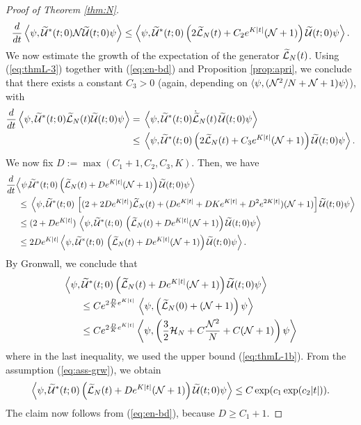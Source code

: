 \documentclass[11pt,a4paper]{article}
\newcommand{\done}{}
\newcommand{\ech}[2]{#2}	%
\newcommand{\cU}{{\cal U}}
\newcommand{\wt}{\widetilde}
\newcommand{\cH}{{\cal H}}
\newcommand{\cL}{{\cal L}}
\newcommand{\cN}{{\cal N}}
\begin{document}
\begin{proof}[Proof of Theorem \ref{thm:N}]
\[  
\frac{d}{dt} \left\langle \psi, \wt{\cU}^* (t;0) \cN \wt{\cU} (t;0) \psi \right\rangle  \leq  \left\langle \psi , \wt{\cU}^* (t;0)  \left(2 \wt{\cL}_N (t) +C_2 e^{K|t|} (\cN + 1) \right)  \wt{\cU} (t;0) \psi \right\rangle.
 \]
We now estimate the growth of the expectation\done{} of the generator $\wt{\cL}_N (t)$. Using (\ref{eq:thmL-3}) together with (\ref{eq:en-bd}) and Proposition \ref{prop:apri}, we conclude that there exists a constant $C_3 >0$ (again, depending on $\langle \psi , (\cN^2/ N + \cN + 1) \psi \rangle$\ech{ and on the constant $C$ in (\ref{eq:varphi-bds})}{}), with 
\[ \begin{split}
\frac{d}{dt} \left\langle \psi, \wt{\cU}^* (t;0) \wt{\cL}_N (t) \wt{\cU} (t;0) \psi \right\rangle = \; & \left\langle \psi, \wt{\cU}^* (t;0) \dot{\wt{\cL}}_N (t) \, \wt{\cU} (t;0) \psi \right\rangle \\ \leq \; & \left\langle \psi , \wt{\cU}^* (t;0) \left( 2 \wt{\cL}_N (t) + C_3 e^{K|t|} (\cN + 1) \right) \wt{\cU} (t;0) \psi \right\rangle. 
\end{split} \]
We now fix $D := \max (C_1 + 1, C_2 , C_3 , K)$. Then, we have
\[ \begin{split} 
\frac{d}{dt} \Big\langle \psi , &\wt{\cU}^* (t;0) \left( \wt{\cL}_N (t) + D e^{K \lvert t\rvert} (\cN + 1) \right) \wt{\cU} (t;0) \psi \Big\rangle \\  \leq \; & \left\langle \psi, \wt{\cU}^* (t;0) \, \left[ (2 + 2D e^{K|t|}) \wt{\cL}_N (t) + (D e^{K |t|} +D K e^{K |t|} + D^2 e^{2K |t|}) (\cN + 1) \right] \wt{\cU} (t;0) \psi \right\rangle\\  \leq \; &(2 + D e^{K|t|}) \, \left\langle \psi, \wt{\cU}^* (t;0) \, \left( \wt{\cL}_N (t) + D e^{K|t|} (\cN + 1) \right) \wt{\cU} (t;0) \psi \right \rangle \\ \leq \; & 2D e^{K |t|} \left\langle \psi, \wt{\cU}^* (t;0) \, \left( \wt{\cL}_N (t) + D e^{K|t|} (\cN + 1) \right) \wt{\cU} (t;0) \psi \right\rangle. \end{split} \]
By Gronwall, we conclude that
\[ \begin{split}  \Big\langle \psi , \wt{\cU}^* &(t;0) \left( \wt{\cL}_N (t) + 
D e^{K \lvert t\rvert} (\cN + 1) \right) \wt{\cU} (t;0) \psi \Big\rangle \\ \leq \; & C e^{2 \frac{D}{K} e^{K |t|}} \, \left\langle \psi , \left( \wt{\cL}_N (0) + (\cN + 1)\right) \psi \right\rangle \\ \leq \; &  C e^{2 \frac{D}{K} e^{K |t|}} \left\langle \psi , \left( \frac{3}{2} \cH_N+ C \frac{\cN^2}{N} + C (\cN+ 1) \right) \psi \right\rangle \end{split} \]
where in the last inequality, we used the upper bound (\ref{eq:thmL-1b}). {F}rom the assumption (\ref{eq:ass-grw}), we obtain 
\[  \Big\langle \psi , \wt{\cU}^* (t;0) \left( \wt{\cL}_N (t) + 
D e^{K \lvert t\rvert} (\cN + 1) \right) \wt{\cU} (t;0) \psi \Big\rangle
\leq C \exp (c_1 \exp (c_2 |t|)). \]
The claim now follows from (\ref{eq:en-bd}), because $D \geq C_1 +1$.
\end{proof}
\end{document}
